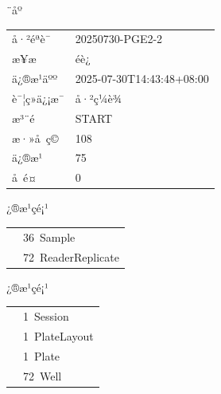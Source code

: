 \documentclass[UTF8,10pt,a4paper,fontset=fandol]{ctexart}
\newcommand{\fieldvalue}[1]{#1}
\begin{document}
\begin{center}
\begin{center}
¨åº

\begin{tabular}{@{}ll@{}}
å·²éªè¯ &
\fieldvalue{20250730-PGE2-2}\\
æ¥æ &
\fieldvalue{éè¿}\\
ä¿®æ¹äºº &
\fieldvalue{2025-07-30T14:43:48+08:00}\\
è¯¦ç»ä¿¡æ¯ &
\fieldvalue{å·²ç¼è¾}\\
æ³¨é &
\fieldvalue{START}\\
æ·»å ç© &
\fieldvalue{108}\\
ä¿®æ¹ &
\fieldvalue{75}\\
å é¤ &
\fieldvalue{0}\\
\end{tabular}

\medskip

¿®æ¹çé¡¹

\begin{tabular}{@{}ll@{}}
&
\fieldvalue{36\ Sample}\\
&
\fieldvalue{72\ ReaderReplicate}\\
\end{tabular}

\medskip

¿®æ¹çé¡¹

\begin{tabular}{@{}ll@{}}
&
\fieldvalue{1\ Session}\\
&
\fieldvalue{1\ PlateLayout}\\
&
\fieldvalue{1\ Plate}\\
&
\fieldvalue{72\ Well}\\
\end{tabular}

\medskip


\end{center}
\end{center}
\end{document}
